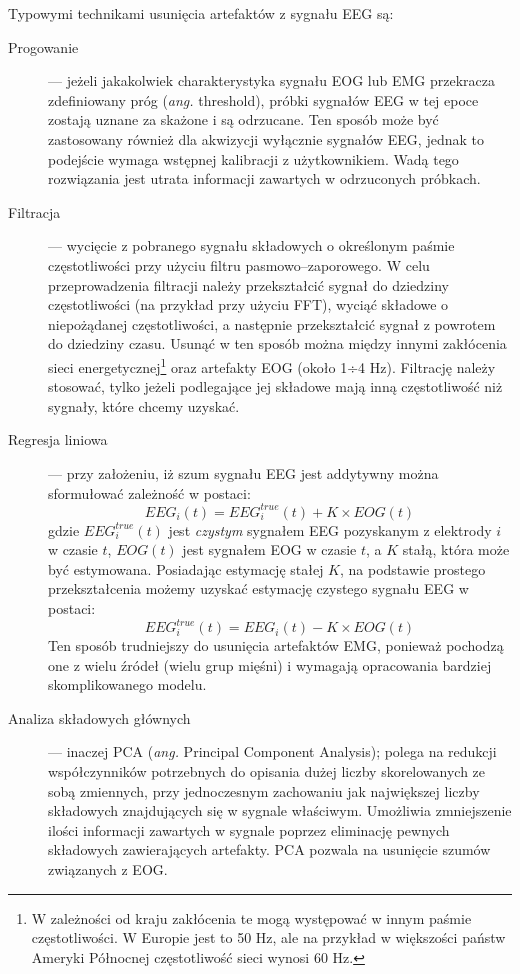 \documentclass[skorowidz,skroty]{dyplomWEZUT}
\begin{document}
Typowymi technikami usunięcia artefaktów z sygnału EEG są\cite{bci_introduction}:
\begin{description}
    \item [Progowanie] --- jeżeli jakakolwiek charakterystyka sygnału EOG lub EMG przekracza zdefiniowany próg (\textit{ang.} threshold), próbki sygnałów EEG w tej epoce zostają uznane za skażone i są odrzucane. Ten sposób może być zastosowany również dla akwizycji wyłącznie sygnałów EEG, jednak to podejście wymaga wstępnej kalibracji z użytkownikiem. Wadą tego rozwiązania jest utrata informacji zawartych w odrzuconych próbkach.
    
    \item [Filtracja] --- wycięcie z pobranego sygnału składowych o określonym paśmie częstotliwości przy użyciu filtru pasmowo--zaporowego. W celu przeprowadzenia filtracji należy przekształcić sygnał do dziedziny częstotliwości (na przykład przy użyciu FFT), wyciąć składowe o niepożądanej częstotliwości, a następnie przekształcić sygnał z powrotem do dziedziny czasu. Usunąć w ten sposób można między innymi zakłócenia sieci energetycznej\footnote{W zależności od kraju zakłócenia te mogą występować w innym paśmie częstotliwości. W Europie jest to 50 Hz, ale na przykład w większości państw Ameryki Północnej częstotliwość sieci wynosi 60 Hz.} oraz artefakty EOG (około 1÷4 Hz). Filtrację należy stosować, tylko jeżeli podlegające jej składowe mają inną częstotliwość niż sygnały, które chcemy uzyskać.
    
    \item [Regresja liniowa] --- przy założeniu, iż szum sygnału EEG jest addytywny można sformułować zależność w postaci\cite{bci_introduction}:
    $$ EEG_i(t) = EEG^{true}_i(t) + K \times EOG(t) $$
    gdzie $EEG^{true}_i(t)$ jest \textit{czystym} sygnałem EEG pozyskanym z elektrody $i$ w czasie $t$, $EOG(t)$ jest sygnałem EOG w czasie $t$, a $K$ stałą, która może być estymowana. Posiadając estymację stałej $K$, na podstawie prostego przekształcenia możemy uzyskać estymację czystego sygnału EEG w postaci:
    $$ EEG^{true}_i(t) = EEG_i(t) - K \times EOG(t) $$
    Ten sposób trudniejszy do usunięcia artefaktów EMG, ponieważ pochodzą one z wielu źródeł (wielu grup mięśni) i wymagają opracowania bardziej skomplikowanego modelu.

    \item [Analiza składowych głównych] --- inaczej PCA (\textit{ang.} Principal Component Analysis); polega na redukcji współczynników potrzebnych do opisania dużej liczby skorelowanych ze sobą zmiennych, przy jednoczesnym zachowaniu jak największej liczby składowych znajdujących się w sygnale właściwym. Umożliwia zmniejszenie ilości informacji zawartych w sygnale poprzez eliminację pewnych składowych zawierających artefakty\cite{eeg_noise}. PCA pozwala na usunięcie szumów związanych z EOG\cite{bci_introduction}.
    

\end{description}
\end{document}

